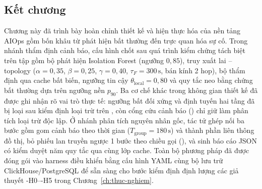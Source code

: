 \subsection{Kết chương}
\label{sec:ch4-ket-chuong}

Chương này đã trình bày hoàn chỉnh thiết kế và hiện thực hóa của nền tảng AIOps gồm bốn khâu từ phát hiện bất thường đến trực quan hóa sự cố. Trong nhánh thẩm định cảnh báo, cấu hình \CTAV{} chốt sau quá trình kiểm chứng tách biệt trên tập  gồm bộ phát hiện Isolation Forest (ngưỡng $0{,}85$), truy xuất lai --topology \textbf{} ($\alpha = 0{,}35$, $\beta = 0{,}25$, $\gamma = 0{,}40$, $\tau_F = 300\,\text{s}$, bán kính 2 hop), bộ thẩm định  qua cache bất biến, ngưỡng tin cậy $\theta_{\text{local}} = 0{,}80$ và quy tắc neo bằng chứng bất thường \textbf{} dựa trên ngưỡng nền  $p_{90}$. Ba cơ chế khác trong không gian thiết kế đã được ghi nhận rõ vai trò thực tế: ngưỡng bất đối xứng \textbf{} và định tuyến hai tầng \textbf{} đã bị loại sau kiểm định loại trừ trên , còn cổng cứu cảnh báo \textbf{} () chỉ giữ làm phân tích loại trừ độc lập. Ở nhánh phân tích nguyên nhân gốc, tác tử  ghép nối ba bước gồm gom cảnh báo theo thời gian ($T_{\text{group}} = 180\,\text{s}$) và thành phần liên thông đồ thị, bỏ phiếu lan truyền ngược 1 bước theo chiều gọi (), và sinh báo cáo JSON có kiểm duyệt năm quy tắc qua cùng lớp cache. Toàn bộ phương pháp đã được đóng gói vào harness điều khiển bằng cấu hình YAML cùng bộ lưu trữ ClickHouse/PostgreSQL để sẵn sàng cho bước kiểm định định lượng các giả thuyết \hyp{H0}--\hyp{H5} trong Chương~\ref{ch:thuc-nghiem}.
